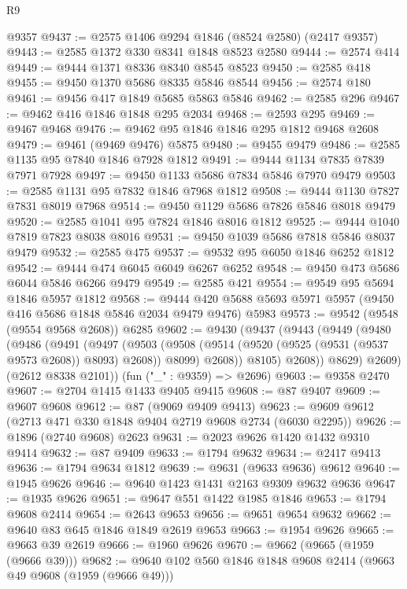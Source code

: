 \begin{lexlean}{R9}
\begin{coremodule}
    @9357
@9437 := @2575 @1406 @9294 @1846 (@8524 @2580) (@2417 @9357)
@9443 := @2585 @1372 @330 @8341 @1848 @8523 @2580
@9444 := @2574 @414
@9449 := @9444 @1371 @8336 @8340 @8545 @8523
@9450 := @2585 @418
@9455 := @9450 @1370 @5686 @8335 @5846 @8544
@9456 := @2574 @180
@9461 := @9456 @417 @1849 @5685 @5863 @5846
@9462 := @2585 @296
@9467 := @9462 @416 @1846 @1848 @295 @2034
@9468 := @2593 @295
@9469 := @9467 @9468
@9476 := @9462 @95 @1846 @1846 @295 @1812 @9468 @2608
@9479 := @9461 (@9469 @9476) @5875
@9480 := @9455 @9479
@9486 := @2585 @1135 @95 @7840 @1846 @7928 @1812
@9491 := @9444 @1134 @7835 @7839 @7971 @7928
@9497 := @9450 @1133 @5686 @7834 @5846 @7970 @9479
@9503 := @2585 @1131 @95 @7832 @1846 @7968 @1812
@9508 := @9444 @1130 @7827 @7831 @8019 @7968
@9514 := @9450 @1129 @5686 @7826 @5846 @8018 @9479
@9520 := @2585 @1041 @95 @7824 @1846 @8016 @1812
@9525 := @9444 @1040 @7819 @7823 @8038 @8016
@9531 := @9450 @1039 @5686 @7818 @5846 @8037 @9479
@9532 := @2585 @475
@9537 := @9532 @95 @6050 @1846 @6252 @1812
@9542 := @9444 @474 @6045 @6049 @6267 @6252
@9548 := @9450 @473 @5686 @6044 @5846 @6266 @9479
@9549 := @2585 @421
@9554 := @9549 @95 @5694 @1846 @5957 @1812
@9568 := @9444 @420 @5688 @5693 @5971 @5957 (@9450 @416 @5686 @1848 @5846 @2034 @9479 @9476) @5983
@9573 := @9542 (@9548 (@9554 @9568 @2608)) @6285
@9602 := @9430
    (@9437
      (@9443
        (@9449
          (@9480
            (@9486
              (@9491
                (@9497
                  (@9503
                    (@9508 (@9514 (@9520 (@9525 (@9531 (@9537 @9573 @2608)) @8093) @2608)) @8099)
                    @2608))
                @8105)
              @2608))
          @8629)
        @2609)
      (@2612 @8338 @2101))
    (fun ("_" : @9359) => @2696)
@9603 := @9358 @2470
@9607 := @2704 @1415 @1433 @9405 @9415
@9608 := @87 @9407
@9609 := @9607 @9608
@9612 := @87 (@9069 @9409 @9413)
@9623 := @9609 @9612 (@2713 @471 @330 @1848 @9404 @2719 @9608 @2734 (@6030 @2295))
@9626 := @1896 (@2740 @9608) @2623
@9631 := @2023 @9626 @1420 @1432 @9310 @9414
@9632 := @87 @9409
@9633 := @1794 @9632
@9634 := @2417 @9413
@9636 := @1794 @9634 @1812
@9639 := @9631 (@9633 @9636) @9612
@9640 := @1945 @9626
@9646 := @9640 @1423 @1431 @2163 @9309 @9632 @9636
@9647 := @1935 @9626
@9651 := @9647 @551 @1422 @1985 @1846
@9653 := @1794 @9608 @2414
@9654 := @2643 @9653
@9656 := @9651 @9654 @9632
@9662 := @9640 @83 @645 @1846 @1849 @2619 @9653
@9663 := @1954 @9626
@9665 := @9663 @39 @2619
@9666 := @1960 @9626
@9670 := @9662 (@9665 (@1959 (@9666 @39)))
@9682 := @9640 @102 @560 @1846 @1848 @9608 @2414 (@9663 @49 @9608 (@1959 (@9666 @49)))

\end{coremodule}
\end{lexlean}
